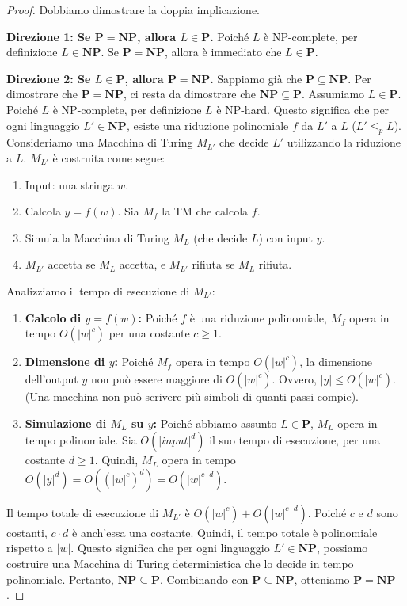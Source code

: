 \documentclass[a4paper]{article}
\theoremstyle{definition} %
\begin{document}
\begin{proof}
Dobbiamo dimostrare la doppia implicazione.

\textbf{Direzione 1: Se $\mathbf{P} = \mathbf{NP}$, allora $L \in \mathbf{P}$.}
Poiché $L$ è NP-complete, per definizione $L \in \mathbf{NP}$. Se $\mathbf{P} = \mathbf{NP}$, allora è immediato che $L \in \mathbf{P}$.

\textbf{Direzione 2: Se $L \in \mathbf{P}$, allora $\mathbf{P} = \mathbf{NP}$.}
Sappiamo già che $\mathbf{P} \subseteq \mathbf{NP}$. Per dimostrare che $\mathbf{P} = \mathbf{NP}$, ci resta da dimostrare che $\mathbf{NP} \subseteq \mathbf{P}$.
Assumiamo $L \in \mathbf{P}$.
Poiché $L$ è NP-complete, per definizione $L$ è NP-hard.
Questo significa che per ogni linguaggio $L' \in \mathbf{NP}$, esiste una riduzione polinomiale $f$ da $L'$ a $L$ ($L' \le_p L$).
Consideriamo una Macchina di Turing $M_{L'}$ che decide $L'$ utilizzando la riduzione a $L$. $M_{L'}$ è costruita come segue:
\begin{enumerate}
    \item Input: una stringa $w$.
    \item Calcola $y = f(w)$. Sia $M_f$ la TM che calcola $f$.
    \item Simula la Macchina di Turing $M_L$ (che decide $L$) con input $y$.
    \item $M_{L'}$ accetta se $M_L$ accetta, e $M_{L'}$ rifiuta se $M_L$ rifiuta.
\end{enumerate}

Analizziamo il tempo di esecuzione di $M_{L'}$:
\begin{enumerate}
    \item \textbf{Calcolo di $y = f(w)$:} Poiché $f$ è una riduzione polinomiale, $M_f$ opera in tempo $O(|w|^c)$ per una costante $c \ge 1$.
    \item \textbf{Dimensione di $y$:} Poiché $M_f$ opera in tempo $O(|w|^c)$, la dimensione dell'output $y$ non può essere maggiore di $O(|w|^c)$. Ovvero, $|y| \le O(|w|^c)$. (Una macchina non può scrivere più simboli di quanti passi compie).
    \item \textbf{Simulazione di $M_L$ su $y$:} Poiché abbiamo assunto $L \in \mathbf{P}$, $M_L$ opera in tempo polinomiale. Sia $O(|input|^d)$ il suo tempo di esecuzione, per una costante $d \ge 1$.
    Quindi, $M_L$ opera in tempo $O(|y|^d) = O((|w|^c)^d) = O(|w|^{c \cdot d})$.
\end{enumerate}
Il tempo totale di esecuzione di $M_{L'}$ è $O(|w|^c) + O(|w|^{c \cdot d})$. Poiché $c$ e $d$ sono costanti, $c \cdot d$ è anch'essa una costante. Quindi, il tempo totale è polinomiale rispetto a $|w|$.
Questo significa che per ogni linguaggio $L' \in \mathbf{NP}$, possiamo costruire una Macchina di Turing deterministica che lo decide in tempo polinomiale.
Pertanto, $\mathbf{NP} \subseteq \mathbf{P}$.
Combinando con $\mathbf{P} \subseteq \mathbf{NP}$, otteniamo $\mathbf{P} = \mathbf{NP}$.
\end{proof}
\end{document}
